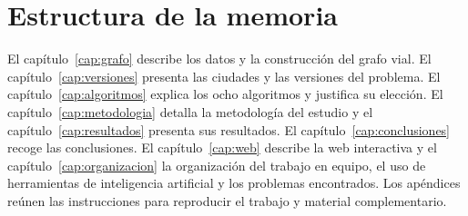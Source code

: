 \section{Estructura de la memoria}

El capítulo~\ref{cap:grafo} describe los datos y la construcción del grafo vial. El capítulo~\ref{cap:versiones} presenta las ciudades y las versiones del problema.
El capítulo~\ref{cap:algoritmos} explica los ocho algoritmos y justifica su elección. El capítulo~\ref{cap:metodologia} detalla la metodología del estudio y el
capítulo~\ref{cap:resultados} presenta sus resultados. El capítulo~\ref{cap:conclusiones} recoge las conclusiones. El capítulo~\ref{cap:web} describe la web interactiva
y el capítulo~\ref{cap:organizacion} la organización del trabajo en equipo, el uso de herramientas de inteligencia artificial y los problemas encontrados. Los apéndices
reúnen las instrucciones para reproducir el trabajo y material complementario.
